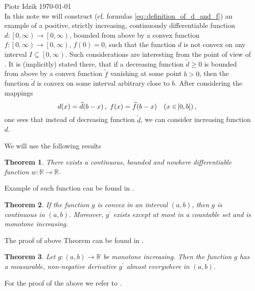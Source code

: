 \documentclass[12pt]{article}
\newcommand{\R}{\mathbb{R}}
\renewcommand{\geq}{\geqslant}
\newcommand{\paren}[1]{\! \left( #1 \right)}
\newcommand{\bracket}[1]{\! \left[ #1 \right]}
\newcommand{\displaybeginfileinfo}{}
\theoremstyle{plain}
\newtheorem{theorem}{Theorem}
\theoremstyle{definition}
\theoremstyle{remark}
\begin{document}
\noindent Piotr Idzik \hfill \today \\
\displaybeginfileinfo
In this note we will construct (cf. formulas \eqref{eq::definition_of_d_and_f}) an example of a positive, strictly increasing, continuously differentiable function $d \colon \left[0, \infty \right) \to \left[0, \infty \right)$, bounded from above by a convex function $f\colon\left[0, \infty \right) \to \left[0, \infty \right)$, $f\paren{0} = 0$, such that the function $d$ is not convex on any interval $I \subseteq \left[0, \infty \right)$.
Such considerations are interesting from the point of view of \cite[p. 167]{Levandosky1998}.
It is (implicitly) stated there, that if a decreasing function $\widetilde{d} \geq 0$ is bounded from above by a convex function $\widetilde{f}$ vanishing at some point $b > 0$, then the function $\widetilde{d}$ is convex on some interval arbitrary close to $b$.
After considering the mappings
\begin{equation*}
    d\paren{x} =  \widetilde{d}\paren{b-x}, \ f\paren{x} =  \widetilde{f}\paren{b-x} \quad \paren{x \in \bracket{0, b}}, \\
\end{equation*}
one sees that instead of decreasing function $\widetilde{d}$, we can consider increasing function $d$. 

We will use the following results
\begin{theorem}
    There exists a continuous, bounded and nowhere differentiable function $w \colon \R \to \R$.
\end{theorem}
Example of such function can be found in \cite[Example 8, p. 38]{gelbaum1964counterexamples}.
 
\begin{theorem} \label{thm::convex_monotone_der}
    If the function $g$ is convex in an interval $\paren{a, b}$, then $g$ is continuous in $\paren{a, b}$.
    Moreover, $g^\prime$ exists except at most in a countable set and is monotone increasing.
\end{theorem}
The proof of above Theorem can be found in \cite[Theorem 7.40, p. 120]{wheeden1977measure}.

\begin{theorem} \label{thm::monotone_diff_ae}
    Let $g \colon \paren{a, b} \to \R$ be monotone increasing.
    Then the function $g$ has a measurable, non-negative derivative $g^\prime$ almost everywhere in $\paren{a, b}$.
\end{theorem}
For the proof of the above we refer to \cite[Theorem 7.21, page 111]{wheeden1977measure}.
\end{document}
